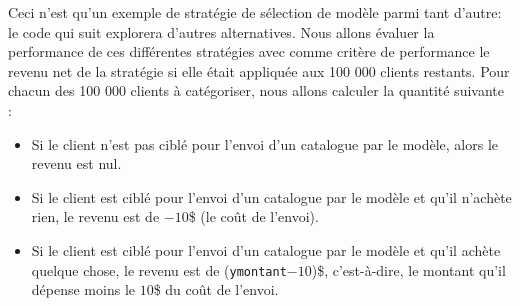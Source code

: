 \documentclass[
  11pt,
  letterpaper,
]{book}
\newenvironment{Shaded}{\begin{snugshade}}{\end{snugshade}}
\newcommand{\AttributeTok}[1]{\textcolor[rgb]{0.40,0.45,0.13}{#1}}
\newcommand{\CommentTok}[1]{\textcolor[rgb]{0.37,0.37,0.37}{#1}}
\newcommand{\DecValTok}[1]{\textcolor[rgb]{0.68,0.00,0.00}{#1}}
\newcommand{\FunctionTok}[1]{\textcolor[rgb]{0.28,0.35,0.67}{#1}}
\newcommand{\NormalTok}[1]{\textcolor[rgb]{0.00,0.23,0.31}{#1}}
\newcommand{\OtherTok}[1]{\textcolor[rgb]{0.00,0.23,0.31}{#1}}
\newcommand{\SpecialCharTok}[1]{\textcolor[rgb]{0.37,0.37,0.37}{#1}}
\newcommand{\StringTok}[1]{\textcolor[rgb]{0.13,0.47,0.30}{#1}}
\providecommand{\tightlist}{%
  \setlength{\itemsep}{0pt}\setlength{\parskip}{0pt}}\usepackage{longtable,booktabs,array}
\theoremstyle{definition}
\theoremstyle{remark}
\begin{document}
\begin{Shaded}
\end{Shaded}

Ceci n'est qu'un exemple de stratégie de sélection de modèle parmi tant
d'autre: le code qui suit explorera d'autres alternatives. Nous allons
évaluer la performance de ces différentes stratégies avec comme critère
de performance le revenu net de la stratégie si elle était appliquée aux
100 000 clients restants. Pour chacun des 100 000 clients à catégoriser,
nous allons calculer la quantité suivante :

\begin{itemize}
\tightlist
\item
  Si le client n'est pas ciblé pour l'envoi d'un catalogue par le
  modèle, alors le revenu est nul.
\item
  Si le client est ciblé pour l'envoi d'un catalogue par le modèle et
  qu'il n'achète rien, le revenu est de \(-10\)\$ (le coût de l'envoi).
\item
  Si le client est ciblé pour l'envoi d'un catalogue par le modèle et
  qu'il achète quelque chose, le revenu est de
  (\texttt{ymontant}\(-10\))\$, c'est-à-dire, le montant qu'il dépense
  moins le \(10\)\$ du coût de l'envoi.
\end{itemize}
\end{document}
